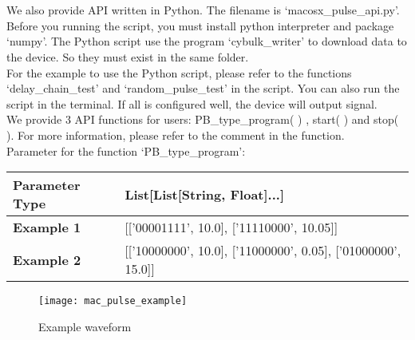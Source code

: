\section{}

\hspace{-0.2cm}We also provide API written in Python. The filename is `macosx\_pulse\_api.py'. Before you running the script, you must install python interpreter and package `numpy'. The Python script use the program `cybulk\_writer' to download data to the device. So they must exist in the same folder.
\\
\indent \hspace{-0.2cm}For the example to use the Python script, please refer to the functions `delay\_chain\_test' and `random\_pulse\_test' in the script. You can also run the script in the terminal. If all is configured well, the device will output signal.
\\
\indent \hspace{-0.2cm}We provide 3 API functions for users: PB\_type\_program( ) , start( ) and stop( ). For more information, please refer to the comment in the function.
\\

\hspace{-0.2cm}Parameter for the function `PB\_type\_program':

\vspace{0.2cm}
\begin{table}[H]
\centering
\normalsize
\begin{tabular}{|m{4cm}<{\centering}|m{6cm}<{\centering}|}
\hline \textbf{Parameter Type} & List[List[String, Float]...]
\\
\hline \textbf{Example 1} & [['00001111', 10.0], ['11110000', 10.05]]
\\
\hline \textbf{Example 2} & [['10000000', 10.0], ['11000000', 0.05], ['01000000', 15.0]] \\\hline
\end{tabular}
\end{table}

\begin{figure}[ht]
\centering
\texttt{[image: mac\_pulse\_example]}
\caption{\hspace{0.2cm}Example waveform}
\label{pulse_example_mac}
\end{figure}

